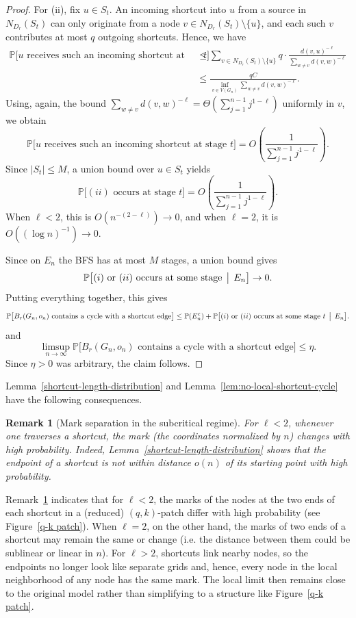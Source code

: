 \documentclass[10pt]{amsart}
\newtheorem{remark}[theorem]{Remark}
\begin{document}
\begin{proof}
For (ii), fix $u\in S_t$. An incoming shortcut into $u$ from a source in $N_{D_r}(S_t)$ can only originate from a node $v\in N_{D_r}(S_t)\setminus\{u\}$, and each such $v$ contributes at most $q$ outgoing shortcuts. Hence, we have
\begin{align*}
    \mathbb P\bigl[u\text{ receives such an incoming shortcut at stage }t\bigr]
    &\le
    \sum_{v\in N_{D_r}(S_t)\setminus\{u\}}
    q\cdot \frac{d(v,u)^{-\ell}}{\sum_{w\neq v} d(v,w)^{-\ell}}
    \\
    &\le
    \frac{qC}{\inf_{v\in V(G_n)}\sum_{w\neq v} d(v,w)^{-\ell}}.
\end{align*}
Using, again, the bound
\(
\sum_{w\neq v} d(v,w)^{-\ell}
=
\Theta\!\left(\sum_{j=1}^{n-1} j^{1-\ell}\right)
\)
uniformly in $v$, we obtain
\[
\mathbb P\bigl[u\text{ receives such an incoming shortcut at stage }t\bigr]
=
O\!\left(\frac{1}{\sum_{j=1}^{n-1} j^{1-\ell}}\right).
\]
Since $|S_t|\le M$, a union bound over $u\in S_t$ yields
\[
\mathbb P\bigl[(ii)\text{ occurs at stage }t\bigr]
=
O\!\left(\frac{1}{\sum_{j=1}^{n-1} j^{1-\ell}}\right).
\]
When $\ell<2$, this is $O(n^{-(2-\ell)})\to 0$, and when $\ell=2$, it is $O((\log n)^{-1})\to 0$.

Since on $E_n$ the BFS has at most $M$ stages, a union bound gives
\[
\mathbb P\bigl[(i)\text{ or }(ii)\text{ occurs at some stage} \,\bigm|\, E_n\bigr]\to 0.
\]
Putting everything together, this gives
\[
\mathbb P\bigl[B_r(G_n,o_n)\text{ contains a cycle with a shortcut edge}\bigr]
\le
\mathbb P(E_n^c)
+
\mathbb P\bigl[(i)\text{ or }(ii)\text{ occurs at some stage }t \,\bigm|\, E_n\bigr].
\]
and
\[
\limsup_{n\to\infty}
\mathbb P\bigl[B_r(G_n,o_n)\text{ contains a cycle with a shortcut edge}\bigr]
\le \eta.
\]
Since $\eta>0$ was arbitrary, the claim follows.
\end{proof}

Lemma~\ref{shortcut-length-distribution} and Lemma~\ref{lem:no-local-shortcut-cycle} have the following consequences.

\begin{remark}[Mark separation in the subcritical regime]\label{mark-change}
For $\ell<2$, whenever one traverses a shortcut, the mark (the coordinates normalized by $n$) changes with high probability. Indeed, Lemma~\ref{shortcut-length-distribution} shows that the endpoint of a shortcut is not within distance $o(n)$ of its starting point with high probability.
\end{remark}

Remark~\ref{mark-change} indicates that for $\ell<2$, the marks of the nodes at the two ends of each shortcut in a (reduced) $(q,k)$-patch differ with high probability (see Figure~\ref{q-k patch}). When $\ell=2$, on the other hand, the marks of two ends of a shortcut may remain the same or change (i.e. the distance between them could be sublinear or linear in $n$). For $\ell>2$, shortcuts link nearby nodes, so the endpoints no longer look like separate grids and, hence, every node in the local neighborhood of any node has the same mark. The local limit then remains close to the original model rather than simplifying to a structure like Figure~\ref{q-k patch}.
\end{document}
